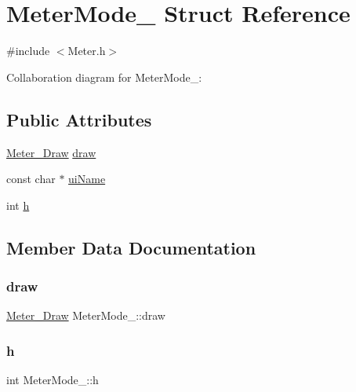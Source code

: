 \hypertarget{structMeterMode__}{}\section{Meter\+Mode\+\_\+ Struct Reference}
\label{structMeterMode__}


{\ttfamily \#include $<$Meter.\+h$>$}



Collaboration diagram for Meter\+Mode\+\_\+\+:
\subsection*{Public Attributes}
\begin{DoxyCompactItemize}
\item 
\hyperlink{Meter_8h_af2bfba1e0c54d7d0dc0511e1805b1725}{Meter\+\_\+\+Draw} \hyperlink{structMeterMode___a3d7c267cd75e9ae8a11cdf4da19ae32c}{draw}
\item 
const char $\ast$ \hyperlink{structMeterMode___aa341af0bcb7b2cf5eb53386a21e1d95d}{ui\+Name}
\item 
int \hyperlink{structMeterMode___a55456e6a687193d76064a91ccb6144da}{h}
\end{DoxyCompactItemize}


\subsection{Member Data Documentation}
\mbox{\label{structMeterMode___a3d7c267cd75e9ae8a11cdf4da19ae32c}} 
\subsubsection{\texorpdfstring{draw}{draw}}
{\footnotesize\ttfamily \hyperlink{Meter_8h_af2bfba1e0c54d7d0dc0511e1805b1725}{Meter\+\_\+\+Draw} Meter\+Mode\+\_\+\+::draw}

\mbox{\label{structMeterMode___a55456e6a687193d76064a91ccb6144da}} 
\subsubsection{\texorpdfstring{h}{h}}
{\footnotesize\ttfamily int Meter\+Mode\+\_\+\+::h}


